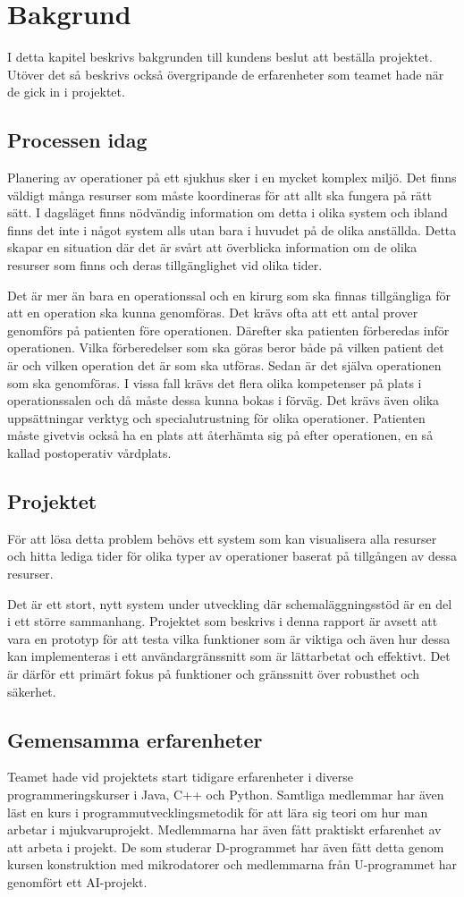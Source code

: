 \chapter{Bakgrund}
I detta kapitel beskrivs bakgrunden till kundens beslut att beställa projektet.
Utöver det så beskrivs också övergripande de erfarenheter som teamet hade när de gick
in i projektet.

\section{Processen idag}
Planering av operationer på ett sjukhus sker i en mycket komplex miljö. Det
finns väldigt många resurser som måste koordineras för att allt ska fungera på rätt sätt.
I dagsläget finns nödvändig information om detta i olika system och ibland finns
det inte i något system alls utan bara i huvudet på de olika anställda. Detta
skapar en situation där det är svårt att överblicka information om de olika
resurser som finns och deras tillgänglighet vid olika tider.

Det är mer än bara en operationssal och en kirurg som ska finnas tillgängliga
för att en operation ska kunna genomföras. Det krävs ofta att ett antal prover
genomförs på patienten före operationen. Därefter ska patienten
förberedas inför operationen. Vilka förberedelser som ska göras beror både på
vilken patient det är och vilken operation det är som ska utföras. Sedan är det
själva operationen som ska genomföras. I vissa fall krävs det flera olika
kompetenser på plats i operationssalen och då måste dessa kunna bokas i förväg.
Det krävs även olika uppsättningar verktyg och specialutrustning för olika
operationer.
Patienten måste givetvis också ha en plats att återhämta sig på efter
operationen, en så kallad postoperativ vårdplats.

\section{Projektet}
För att lösa detta problem behövs ett system som kan visualisera alla resurser
och hitta lediga tider för olika typer av operationer baserat på tillgången av
dessa resurser.

Det är ett stort, nytt system under utveckling där schemaläggningsstöd är en del
i ett större sammanhang. Projektet som beskrivs i denna rapport är avsett att vara
en prototyp för att testa vilka funktioner som är viktiga och även hur dessa
kan implementeras i ett användargränssnitt som är lättarbetat och effektivt.
Det är därför ett primärt fokus på funktioner och gränssnitt över robusthet och
säkerhet.

\section{Gemensamma erfarenheter}
Teamet hade vid projektets start tidigare erfarenheter i diverse programmeringskurser i Java, C++ och Python. 
Samtliga medlemmar har även läst en kurs i programmutvecklingsmetodik för att lära sig teori om hur man arbetar i mjukvaruprojekt. 
Medlemmarna har även fått praktiskt erfarenhet av att arbeta i projekt. De som studerar D-programmet har även fått detta genom kursen konstruktion med mikrodatorer och medlemmarna från U-programmet har genomfört ett AI-projekt.
